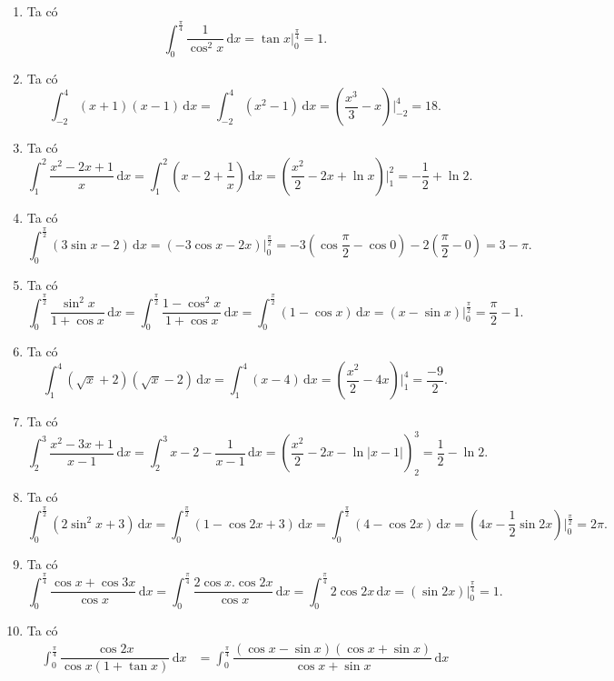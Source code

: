 \begin{bt}
{\begin{enumerate}
			\item Ta có \[\displaystyle\int_0^{\tfrac{\pi }4}{\dfrac1{{{\cos  }^2}x}\mathrm{\,d}x}=\tan x \Bigg|_0^{\tfrac{\pi }4}=1.\]
			\item Ta  có \[\displaystyle\int_{-2}^4{\left(x+1\right)\left(x-1\right)}\mathrm{\,d}x=\displaystyle\int_{-2}^4{\left({x^2}-1\right)}\mathrm{\,d}x=\left(\dfrac{x^3}3-x\right) \Bigg|_{-2}^4=18.\]
			\item Ta có \[\displaystyle\int_1^2{\dfrac{{x^2}-2x+1}x} \mathrm{\,d}x=\displaystyle\int_1^2{\left(x-2+\dfrac1x\right)  }\mathrm{\,d}x=\left(\dfrac{x^2}2-2x+\ln x\right) \Bigg|_1^2=-\dfrac12+\ln 2.\]
			\item Ta có \[\displaystyle\int_0^{\tfrac\pi2}{\left(3\sin x-2\right)} \mathrm{\,d}x=\left(-3\cos x-2x\right) \Bigg|_0^{\tfrac\pi2}=-3\left(\cos\dfrac\pi2-\cos  0\right)-2\left(\dfrac\pi2-0\right)=3-\pi .\]
			\item Ta có \[\displaystyle\int_0^{\tfrac\pi2}{\dfrac{{{\sin }^2}x}{1+\cos x}} \mathrm{\,d}x=\displaystyle\int_0^{\tfrac\pi2}{\dfrac{1-{{\cos  }^2}x}{1+\cos x}} \mathrm{\,d}x=\displaystyle\int_0^{\tfrac\pi2}{\left(1-\cos x\right)} \mathrm{\,d}x=\left(x-\sin x\right) \Bigg|_0^{\tfrac\pi2}=\dfrac\pi2-1.\]
			\item Ta có \[\displaystyle\int_1^4{\left(\sqrt x+2\right)\left(\sqrt  x-2\right)}\mathrm{\,d}x=\displaystyle\int_1^4{\left(x-4\right)}\mathrm{\,d}x=\left(\dfrac{x^2}2-4x\right) \Bigg|_1^4=\dfrac{-9}2.\]
			\item Ta có \[\displaystyle\int_2^3{\dfrac{{x^2}-3x+1}{x-1}\mathrm{\,d}x}=\displaystyle\int_2^3{x-2-\dfrac1{x-1}\mathrm{\,d}x}=\left(\dfrac{x^2}2-2x-\ln|x-1  |\right)_2^3=\dfrac12-\ln 2.\]
			\item Ta có \[\displaystyle\int_0^{\tfrac\pi2}{\left(2{{\sin }^2}x+3\right)}\mathrm{\,d}x=\displaystyle\int_0^{\tfrac\pi2}{\left(1-\cos2x+3\right)}\mathrm{\,d}x=\displaystyle\int_0^{\tfrac\pi2}{\left(4-\cos2x\right)}\mathrm{\,d}x=\left(4x-\dfrac12\sin2x\right) \Bigg|_0^{\tfrac\pi2}=2\pi .\] 
			\item Ta có \[\displaystyle\int_0^{\tfrac{\pi }4}{\dfrac{\cos x+\cos3x}{\cos x}}\mathrm{\,d}x=\displaystyle\int_0^{\tfrac{\pi  }4}{\dfrac{2\cos x.\cos2x}{\cos x}}\mathrm{\,d}x=\displaystyle\int_0^{\tfrac{\pi }4}{2\cos2x}\mathrm{\,d}x=\left(\sin2x\right) \Bigg|_0^{\tfrac{\pi }4}=1.\]
			\item  Ta có
			\begin{align*}
				\displaystyle\int_0^{\tfrac{\pi }4}{\dfrac{\cos2x}{\cos x\left(1+\tan  x\right)}}\mathrm{\,d}x&=\displaystyle\int_0^{\tfrac{\pi }4}{\dfrac{\left(\cos x-\sin x\right)\left(\cos x+\sin x\right)}{\cos x+\sin x}}\mathrm{\,d}x\\

\end{align*}
\end{enumerate}}
\end{bt}
